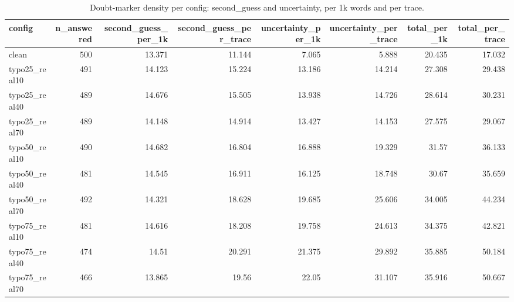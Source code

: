 \documentclass[11pt]{article}
\begin{document}
\begin{table}[H]
\centering
\caption{Doubt-marker density per config: second\_guess and uncertainty, per 1k words and per trace.}
\small
\begin{adjustbox}{max width=\textwidth}
\begin{tabular}{lrrrrrrr}
\toprule
\textbf{config} & \textbf{n\_answered} & \textbf{second\_guess\_per\_1k} & \textbf{second\_guess\_per\_trace} & \textbf{uncertainty\_per\_1k} & \textbf{uncertainty\_per\_trace} & \textbf{total\_per\_1k} & \textbf{total\_per\_trace} \\
\midrule
clean & 500 & 13.371 & 11.144 & 7.065 & 5.888 & 20.435 & 17.032 \\
typo25\_real10 & 491 & 14.123 & 15.224 & 13.186 & 14.214 & 27.308 & 29.438 \\
typo25\_real40 & 489 & 14.676 & 15.505 & 13.938 & 14.726 & 28.614 & 30.231 \\
typo25\_real70 & 489 & 14.148 & 14.914 & 13.427 & 14.153 & 27.575 & 29.067 \\
typo50\_real10 & 490 & 14.682 & 16.804 & 16.888 & 19.329 & 31.57 & 36.133 \\
typo50\_real40 & 481 & 14.545 & 16.911 & 16.125 & 18.748 & 30.67 & 35.659 \\
typo50\_real70 & 492 & 14.321 & 18.628 & 19.685 & 25.606 & 34.005 & 44.234 \\
typo75\_real10 & 481 & 14.616 & 18.208 & 19.758 & 24.613 & 34.375 & 42.821 \\
typo75\_real40 & 474 & 14.51 & 20.291 & 21.375 & 29.892 & 35.885 & 50.184 \\
typo75\_real70 & 466 & 13.865 & 19.56 & 22.05 & 31.107 & 35.916 & 50.667 \\
\bottomrule
\end{tabular}
\end{adjustbox}
\end{table}
\end{document}
